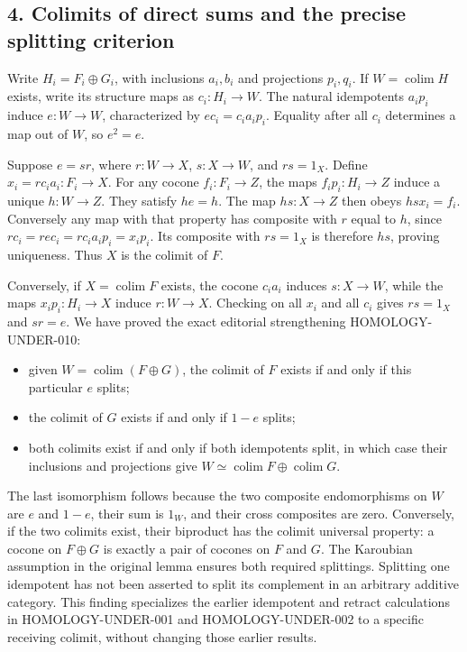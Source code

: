 \documentclass[11pt]{article}
\providecommand{\tightlist}{\setlength{\itemsep}{0pt}\setlength{\parskip}{0pt}}
\begin{document}
\subsection{4. Colimits of direct sums and the precise splitting criterion}\label{note-09-colimits-of-direct-sums-and-the-precise-splitting-criterion}

Write \(H_i=F_i\oplus G_i\), with inclusions \(a_i,b_i\) and projections \(p_i,q_i\). If \(W=\operatorname{colim}H\) exists, write its structure maps as \(c_i:H_i\to W\). The natural idempotents \(a_i p_i\) induce \(e:W\to W\), characterized by \(e c_i=c_i a_i p_i\). Equality after all \(c_i\) determines a map out of \(W\), so \(e^2=e\).

Suppose \(e=s r\), where \(r:W\to X\), \(s:X\to W\), and \(rs=1_X\). Define \(x_i=r c_i a_i:F_i\to X\). For any cocone \(f_i:F_i\to Z\), the maps \(f_i p_i:H_i\to Z\) induce a unique \(h:W\to Z\). They satisfy \(he=h\). The map \(hs:X\to Z\) then obeys \(hs x_i=f_i\). Conversely any map with that property has composite with \(r\) equal to \(h\), since \(r c_i=r e c_i=r c_i a_i p_i=x_i p_i\). Its composite with \(rs=1_X\) is therefore \(hs\), proving uniqueness. Thus \(X\) is the colimit of \(F\).

Conversely, if \(X=\operatorname{colim}F\) exists, the cocone \(c_i a_i\) induces \(s:X\to W\), while the maps \(x_i p_i:H_i\to X\) induce \(r:W\to X\). Checking on all \(x_i\) and all \(c_i\) gives \(rs=1_X\) and \(sr=e\). We have proved the exact editorial strengthening HOMOLOGY-UNDER-010:

\begin{itemize}
\tightlist
\item
  given \(W=\operatorname{colim}(F\oplus G)\), the colimit of \(F\) exists if and only if this particular \(e\) splits;
\item
  the colimit of \(G\) exists if and only if \(1-e\) splits;
\item
  both colimits exist if and only if both idempotents split, in which case their inclusions and projections give \(W\simeq\operatorname{colim}F\oplus\operatorname{colim}G\).
\end{itemize}

The last isomorphism follows because the two composite endomorphisms on \(W\) are \(e\) and \(1-e\), their sum is \(1_W\), and their cross composites are zero. Conversely, if the two colimits exist, their biproduct has the colimit universal property: a cocone on \(F\oplus G\) is exactly a pair of cocones on \(F\) and \(G\). The Karoubian assumption in the original lemma ensures both required splittings. Splitting one idempotent has not been asserted to split its complement in an arbitrary additive category. This finding specializes the earlier idempotent and retract calculations in HOMOLOGY-UNDER-001 and HOMOLOGY-UNDER-002 to a specific receiving colimit, without changing those earlier results.
\end{document}
